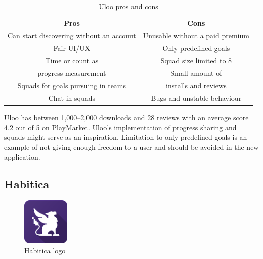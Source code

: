 \begin{table}[h!]
    \centering
    \begin{adjustbox}{width=\textwidth}
        \begin{ctucolortab}
            \begin{tabular}{cc}
                \bfseries Pros & \bfseries Cons\\\Midrule
                Can start discovering without an account & Unusable without a paid premium\\
                Fair UI/UX & Only predefined goals\\
                Time or count as & Squad size limited to 8\\
                progress measurement & Small amount of \\
                Squads for goals pursuing in teams & installs and reviews\\
                Chat in squads & Bugs and unstable behaviour\\
            \end{tabular}
        \end{ctucolortab}
    \end{adjustbox}
    \caption{Uloo pros and cons}\label{tab:uloo-pros-cons}
\end{table}

Uloo has between 1,000--2,000 downloads and 28 reviews with an average score 4.2 out of 5 on PlayMarket.
Uloo's implementation of progress sharing and squads might serve as an inspiration.
Limitation to only predefined goals is an example of not giving enough freedom to a user and should be avoided in the new application.


\subsection{Habitica}\label{subsec:habitica}

\begin{figure}[h!]
    \includegraphics[width=0.20\textwidth]{images/habitica-logo}
    \caption{Habitica logo~\cite{habitica-logo}}
    \label{fig:habitica-logo}
\end{figure}

